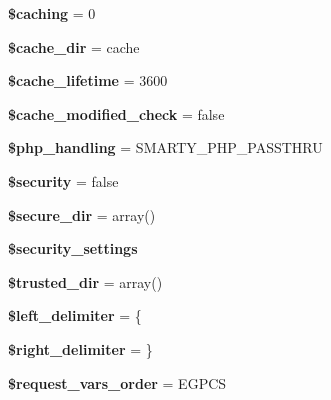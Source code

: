 \begin{DoxyCompactItemize}
\mbox{\label{class_smarty_a9101eba8b1fdcc5bec032762c238c1b8}} 
{\bfseries \$caching} = 0
\item 
\mbox{\label{class_smarty_a64ac02b6867d3aef4bcafa25c67a3e4a}} 
{\bfseries \$cache\+\_\+dir} = \textquotesingle{}cache\textquotesingle{}
\item 
\mbox{\label{class_smarty_a4d529ed586123c88f34616766ac5cefe}} 
{\bfseries \$cache\+\_\+lifetime} = 3600
\item 
\mbox{\label{class_smarty_a51e6b1cea2a9116edf8c146d9d1db2ff}} 
{\bfseries \$cache\+\_\+modified\+\_\+check} = false
\item 
\mbox{\label{class_smarty_ae4d52a7641ea990fb2075e634cb75b45}} 
{\bfseries \$php\+\_\+handling} = S\+M\+A\+R\+T\+Y\+\_\+\+P\+H\+P\+\_\+\+P\+A\+S\+S\+T\+H\+RU
\item 
\mbox{\label{class_smarty_a97a0ffd8cca13ca8361aa7210638f82a}} 
{\bfseries \$security} = false
\item 
\mbox{\label{class_smarty_ae1fbe5167cf064419377e42a6d7656fe}} 
{\bfseries \$secure\+\_\+dir} = array()
\item 
{\bfseries \$security\+\_\+settings}
\item 
\mbox{\label{class_smarty_ac2fbda05d1acd4b221861a2f75609e07}} 
{\bfseries \$trusted\+\_\+dir} = array()
\item 
\mbox{\label{class_smarty_afec4ea15238942459895773f6d46473d}} 
{\bfseries \$left\+\_\+delimiter} = \textquotesingle{}\{\textquotesingle{}
\item 
\mbox{\label{class_smarty_aa0d3833fb09fb62b7efbe34c773de3ad}} 
{\bfseries \$right\+\_\+delimiter} = \textquotesingle{}\}\textquotesingle{}
\item 
\mbox{\label{class_smarty_acc5bb69298e34af2033767503d9e30b8}} 
{\bfseries \$request\+\_\+vars\+\_\+order} = \textquotesingle{}E\+G\+P\+CS\textquotesingle{}
\item 
\mbox{\label{class_smarty_ab2437beb1465da42213fb65e5682a2c2}} 

\end{DoxyCompactItemize}
